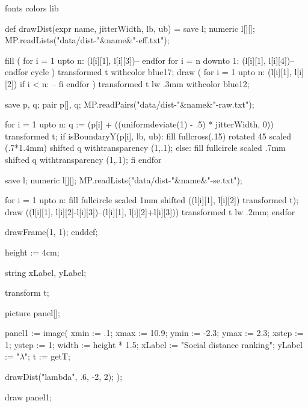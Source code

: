 \environment fonts
\environment colors
\environment lib

\startMPdefinitions
def drawDist(expr name, jitterWidth, lb, ub) =
  save l;
  numeric l[][];
  MP.readLists("data/dist-"&name&"-eff.txt");

  fill (
    for i = 1 upto n:
      (l[i][1], l[i][3])--
    endfor
    for i = n downto 1:
      (l[i][1], l[i][4])--
    endfor
    cycle
  ) transformed t withcolor blue17;
  draw (
    for i = 1 upto n:
      (l[i][1], l[i][2])
      if i < n: -- fi
    endfor
  ) transformed t lw .3mm withcolor blue12;

  save p, q;
  pair p[], q;
  MP.readPairs("data/dist-"&name&"-raw.txt");

  for i = 1 upto n:
    q := (p[i] + ((uniformdeviate(1) - .5) * jitterWidth, 0)) transformed t;
    if isBoundaryY(p[i], lb, ub):
      fill fullcross(.15) rotated 45 scaled (.7*1.4mm) shifted q withtransparency (1,.1);
    else:
      fill fullcircle scaled .7mm shifted q withtransparency (1,.1);
    fi
  endfor

  save l;
  numeric l[][];
  MP.readLists("data/dist-"&name&"-se.txt");

  for i = 1 upto n:
    fill fullcircle scaled 1mm shifted ((l[i][1], l[i][2]) transformed t);
    draw ((l[i][1], l[i][2]-l[i][3])--(l[i][1], l[i][2]+l[i][3])) transformed t lw .2mm;
  endfor

  drawFrame(1, 1);
enddef;
\stopMPdefinitions

\startMPpage

height := 4cm;

string xLabel, yLabel;

transform t;

picture panel[];

panel1 := image(
  xmin := .1;
  xmax := 10.9;
  ymin := -2.3;
  ymax := 2.3;
  xstep := 1;
  ystep := 1;
  width := height * 1.5;
  xLabel := "Social distance ranking";
  yLabel := "$\lambda$";
  t := getT;

  drawDist("lambda", .6, -2, 2);
);

draw panel1;
\stopMPpage